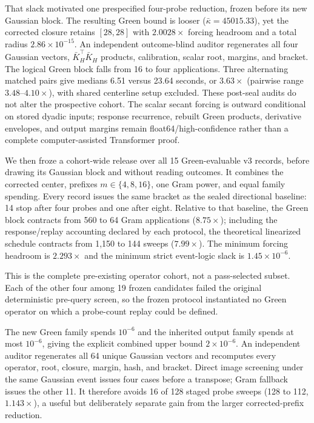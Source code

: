 \documentclass{article}
\begin{document}
That slack motivated one prespecified four-probe reduction, frozen before its
new Gaussian block.  The resulting Green bound is looser
($\bar\kappa=45015.33$), yet the corrected closure retains $[28,28]$ with
$2.0028\times$ forcing headroom and a total radius
$2.86\times10^{-15}$.  An independent outcome-blind auditor regenerates all
four Gaussian vectors, $\bar K_H^\top\bar K_H$ products, calibration, scalar
root, margins, and bracket.  The logical Green block falls from 16 to four
applications.  Three alternating matched pairs give medians 6.51 versus
23.64 seconds, or $3.63\times$ (pairwise range $3.48$--$4.10\times$), with
shared centerline setup excluded.  These post-seal audits do not alter the
prospective cohort.  The scalar secant forcing is outward conditional on stored
dyadic inputs; response recurrence, rebuilt Green products, derivative
envelopes, and output margins remain float64/high-confidence rather than a
complete computer-assisted Transformer proof.

We then froze a cohort-wide release over all 15 Green-evaluable v3 records,
before drawing its Gaussian block and without reading outcomes.  It combines
the corrected center, prefixes $m\in\{4,8,16\}$, one Gram power, and equal
family spending.  Every record issues the same bracket as the sealed
directional baseline: 14 stop after four probes and one after eight.  Relative
to that baseline, the Green block contracts from 560 to 64 Gram applications
($8.75\times$); including the response/replay accounting declared by each
protocol, the theoretical linearized schedule contracts from 1,150 to 144
sweeps ($7.99\times$).  The minimum forcing headroom is $2.293\times$ and the
minimum strict event-logic slack is $1.45\times10^{-6}$.

This is the complete pre-existing operator cohort, not a pass-selected subset.
Each of the other four among 19 frozen candidates failed the original
deterministic pre-query screen, so the frozen protocol instantiated no Green
operator on which a probe-count replay could be defined.

The new Green family spends $10^{-6}$ and the inherited output family spends
at most $10^{-6}$, giving the explicit combined upper bound $2\times10^{-6}$.
An independent auditor regenerates all 64 unique Gaussian vectors and
recomputes every operator, root, closure, margin, hash, and bracket.  Direct
image screening under the same Gaussian event issues four cases before a
transpose; Gram fallback issues the other 11.  It therefore avoids 16 of 128
staged probe sweeps (128 to 112, $1.143\times$), a useful but deliberately
separate gain from the larger corrected-prefix reduction.
\end{document}
